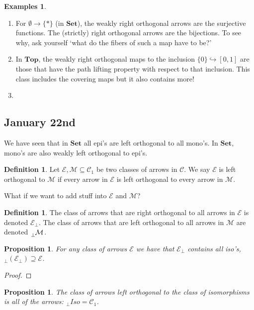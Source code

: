\documentclass[11pt]{amsart}
\theoremstyle{plain}
\newtheorem{prop}[thm]{Proposition}
\theoremstyle{definition}
\newtheorem{defn}[thm]{Definition}
\newtheorem*{egs*}{Examples}
\newcommand{\cC}{{\mathcal C}}
\newcommand{\cE}{{\mathcal E}}
\newcommand{\cM}{{\mathcal M}}
\newcommand{\Top}{\mathbf{Top}}
\newcommand{\Set}{{\mathbf{Set}}}
\newcommand{\noi}{{\noindent}}
\begin{document}
\begin{egs*}\
  \begin{enumerate}[label=(\alph*)]
  \item For $\emptyset \to \{*\}$ (in $\Set$), the weakly right orthogonal arrows are the surjective functions. The (strictly) right orthogonal arrows are the bijections. To see why, ask yourself `what do the fibers of such a map have to be?' 
  \item In $\Top$, the weakly right orthogonal maps to the inclusion $\{0\} \hookrightarrow [0,1]$ are those that have the path lifting property with respect to that inclusion. This class includes the covering maps but it also contains more! 
  \item 
  
  \end{enumerate}
\end{egs*}


\subsection{January 22nd} 

We have seen that in $\Set$ all epi's are left orthogonal to all mono's. In $\Set$, mono's are also weakly left orthogonal to epi's. 


\begin{defn}
Let $\cE, \cM \subseteq \cC_1$ be two classes of arrows in $\cC$. We say $\cE$ is left orthogonal to $\cM$ if every arrow in $\cE$ is left orthogonal to every arrow in $\cM$. 
\end{defn}

\noi What if we want to add stuff into $\cE$ and $\cM$? 

\begin{defn}
The class of arrows that are right orthogonal to all arrows in $\cE$ is denoted $\cE_\perp$. The class of arrows that are left orthogonal to all arrows in $\cM$ are denoted $\tensor[_\perp]{\cM}{}$.
\end{defn}

\begin{prop}
For any class of arrows $\cE$ we have that $\cE_\perp$ contains all iso's, $ {_\perp}(\cE_\perp) \supseteq \cE$.
\end{prop}
\begin{proof}
\end{proof}

\begin{prop}
The class of arrows left orthogonal to the class of isomorphisms is all of the arrows: $_\perp Iso = \cC_1$. 
\end{prop}
\end{document}
